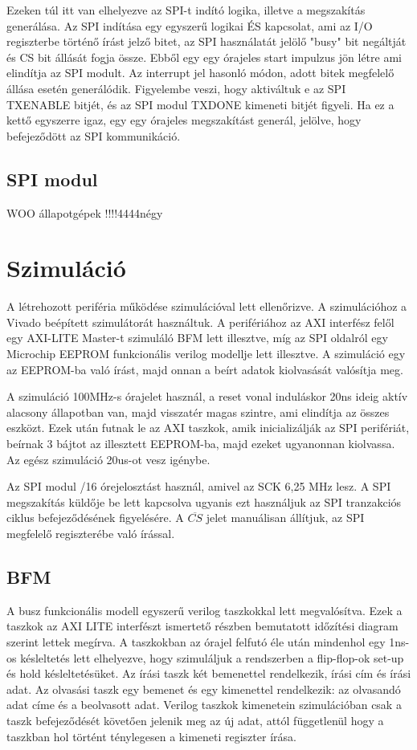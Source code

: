 \documentclass[a4paper,11pt]{article}
\begin{document}
Ezeken túl itt van elhelyezve az SPI-t indító logika, illetve a megszakítás generálása. Az SPI indítása egy egyszerű logikai ÉS kapcsolat, ami az I/O regiszterbe történő írást jelző bitet, az SPI használatát jelölő "busy" bit negáltját és CS bit állását fogja össze. Ebből egy egy órajeles start impulzus jön létre ami elindítja az SPI modult. Az interrupt jel hasonló módon, adott bitek megfelelő állása esetén generálódik. Figyelembe veszi, hogy aktiváltuk e az SPI TX\textunderscore ENABLE bitjét, és az SPI modul TXDONE kimeneti bitjét figyeli. Ha ez a kettő egyszerre igaz, egy egy órajeles megszakítást generál, jelölve, hogy befejeződött az SPI kommunikáció.

\subsection{SPI modul}

WOO állapotgépek !!!!4444négy

\section{Szimuláció}
A létrehozott periféria működése szimulációval lett ellenőrizve. A szimulációhoz a Vivado beépített szimulátorát használtuk. A perifériához az AXI interfész felől egy AXI-LITE Master-t szimuláló BFM lett illesztve, míg az SPI oldalról egy Microchip EEPROM funkcionális verilog modellje lett illesztve. A szimuláció egy az EEPROM-ba való írást, majd onnan a beírt adatok kiolvasását valósítja meg.

A szimuláció 100MHz-s órajelet használ, a reset vonal induláskor 20ns ideig aktív alacsony állapotban van, majd visszatér magas szintre, ami elindítja az összes eszközt. Ezek után futnak le az AXI taszkok, amik inicializálják az SPI perifériát, beírnak 3 bájtot az illesztett EEPROM-ba, majd ezeket ugyanonnan kiolvassa. Az egész szimuláció 20us-ot vesz igénybe.

Az SPI modul /16 órejelosztást használ, amivel az SCK 6,25 MHz lesz. A SPI megszakítás küldője be lett kapcsolva ugyanis ezt használjuk az SPI tranzakciós ciklus befejeződésének figyelésére. A $\overline{CS}$ jelet manuálisan állítjuk, az SPI megfelelő regiszterébe való írással.
\subsection{BFM}

A busz funkcionális modell egyszerű verilog taszkokkal lett megvalósítva. Ezek a taszkok az AXI LITE interfészt ismertető részben bemutatott időzítési diagram szerint lettek megírva. A taszkokban az órajel felfutó éle után mindenhol egy 1ns-os késleltetés lett elhelyezve, hogy szimuláljuk a rendszerben a flip-flop-ok set-up és hold késleltetésüket. Az írási taszk két bemenettel rendelkezik, írási cím és írási adat. Az olvasási taszk egy bemenet és egy kimenettel rendelkezik: az olvasandó adat címe és a beolvasott adat. Verilog taszkok kimenetein szimulációban csak a taszk befejeződését követően jelenik meg az új adat, attól függetlenül hogy a taszkban hol történt ténylegesen a kimeneti regiszter írása.
\end{document}
